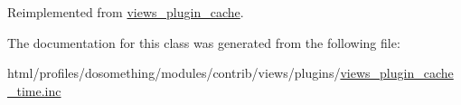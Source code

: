 Reimplemented from \hyperlink{classviews__plugin__cache_a35e5232e39c8148476328e302787d16b}{views\_\-plugin\_\-cache}.

The documentation for this class was generated from the following file:\begin{DoxyCompactItemize}
\item 
html/profiles/dosomething/modules/contrib/views/plugins/\hyperlink{views__plugin__cache__time_8inc}{views\_\-plugin\_\-cache\_\-time.inc}\end{DoxyCompactItemize}
